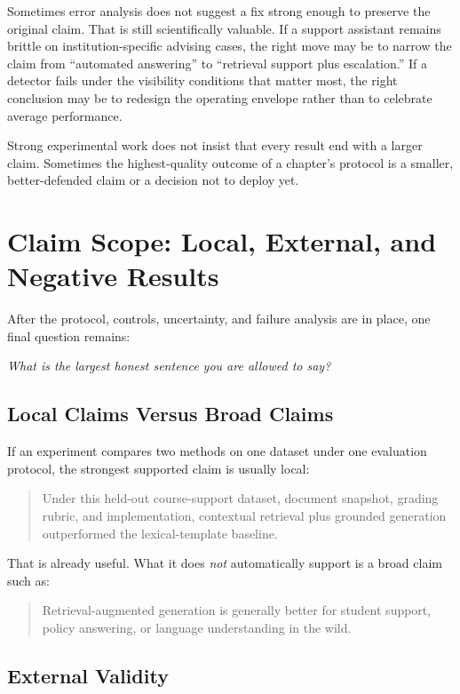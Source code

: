 Sometimes error analysis does not suggest a fix strong enough to preserve the original claim. That is still scientifically valuable. If a support assistant remains brittle on institution-specific advising cases, the right move may be to narrow the claim from ``automated answering'' to ``retrieval support plus escalation.'' If a detector fails under the visibility conditions that matter most, the right conclusion may be to redesign the operating envelope rather than to celebrate average performance.

\begin{evidencebox}
Strong experimental work does not insist that every result end with a larger claim. Sometimes the highest-quality outcome of a chapter's protocol is a smaller, better-defended claim or a decision not to deploy yet.
\end{evidencebox}

\section{Claim Scope: Local, External, and Negative Results}

After the protocol, controls, uncertainty, and failure analysis are in place, one final question remains:

\begin{center}
\emph{What is the largest honest sentence you are allowed to say?}
\end{center}

\subsection{Local Claims Versus Broad Claims}

If an experiment compares two methods on one dataset under one evaluation protocol, the strongest supported claim is usually local:
\begin{quote}
Under this held-out course-support dataset, document snapshot, grading rubric, and implementation, contextual retrieval plus grounded generation outperformed the lexical-template baseline.
\end{quote}
That is already useful. What it does \emph{not} automatically support is a broad claim such as:
\begin{quote}
Retrieval-augmented generation is generally better for student support, policy answering, or language understanding in the wild.
\end{quote}

\subsection{External Validity}

